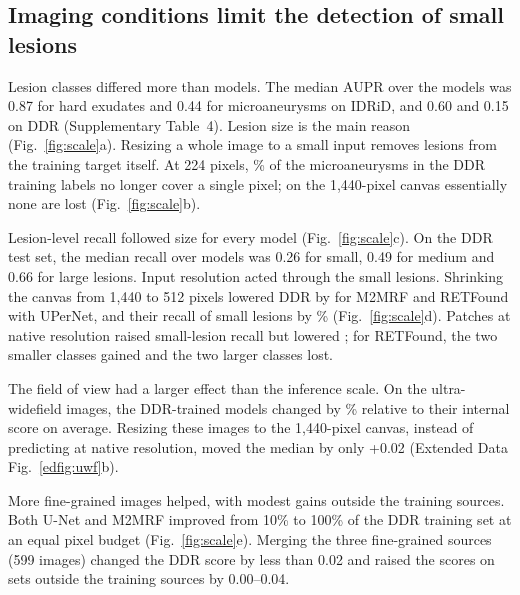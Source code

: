 \subsection{Imaging conditions limit the detection of small lesions}
Lesion classes differed more than models. The median AUPR over the  models was 0.87 for hard exudates and 0.44 for microaneurysms on IDRiD, and 0.60 and 0.15 on DDR (Supplementary Table~4). Lesion size is the main reason (Fig.~\ref{fig:scale}a). Resizing a whole image to a small input removes lesions from the training target itself. At 224 pixels, \% of the microaneurysms in the DDR training labels no longer cover a single pixel; on the 1,440-pixel canvas essentially none are lost (Fig.~\ref{fig:scale}b).

Lesion-level recall followed size for every model (Fig.~\ref{fig:scale}c). On the DDR test set, the median recall over models was 0.26 for small, 0.49 for medium and 0.66 for large lesions. Input resolution acted through the small lesions. Shrinking the canvas from 1,440 to 512 pixels lowered DDR \mAUPR{} by  for M2MRF and RETFound with UPerNet, and their recall of small lesions by \% (Fig.~\ref{fig:scale}d). Patches at native resolution raised small-lesion recall but lowered \mAUPR; for RETFound, the two smaller classes gained and the two larger classes lost.

The field of view had a larger effect than the inference scale. On the ultra-widefield images, the DDR-trained models changed by \% relative to their internal score on average. Resizing these images to the 1,440-pixel canvas, instead of predicting at native resolution, moved the median \mAUPR{} by only +0.02 (Extended Data Fig.~\ref{edfig:uwf}b).

More fine-grained images helped, with modest gains outside the training sources. Both U-Net and M2MRF improved from 10\% to 100\% of the DDR training set at an equal pixel budget (Fig.~\ref{fig:scale}e). Merging the three fine-grained sources (599 images) changed the DDR score by less than 0.02 and raised the scores on sets outside the training sources by 0.00--0.04.

